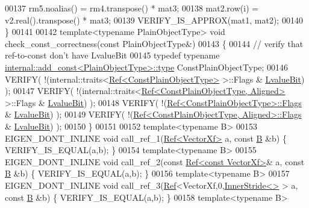 \begin{DoxyCode}
00137   rm5.noalias() = rm4.transpose() * mat3;
00138   mat2.row(i) = v2.real().transpose() * mat3;
00139   VERIFY\_IS\_APPROX(mat1, mat2);
00140 \}
00141 
00142 \textcolor{keyword}{template}<\textcolor{keyword}{typename} PlainObjectType> \textcolor{keywordtype}{void} check\_const\_correctness(\textcolor{keyword}{const} PlainObjectType&)
00143 \{
00144   \textcolor{comment}{// verify that ref-to-const don't have LvalueBit}
00145   \textcolor{keyword}{typedef} \textcolor{keyword}{typename} \hyperlink{group___core___module_class_eigen_1_1_transpose}{internal::add\_const<PlainObjectType>::type} 
      ConstPlainObjectType;
00146   VERIFY( !(internal::traits<\hyperlink{group___core___module_class_eigen_1_1_ref}{Ref<ConstPlainObjectType>} >::Flags & 
      \hyperlink{group__flags_gae2c323957f20dfdc6cb8f44428eaec1a}{LvalueBit}) );
00147   VERIFY( !(internal::traits<\hyperlink{group___core___module_class_eigen_1_1_ref}{Ref<ConstPlainObjectType, Aligned>} >::Flags 
      & \hyperlink{group__flags_gae2c323957f20dfdc6cb8f44428eaec1a}{LvalueBit}) );
00148   VERIFY( !(\hyperlink{group___core___module_class_eigen_1_1_ref}{Ref<ConstPlainObjectType>::Flags} & 
      \hyperlink{group__flags_gae2c323957f20dfdc6cb8f44428eaec1a}{LvalueBit}) );
00149   VERIFY( !(\hyperlink{group___core___module_class_eigen_1_1_ref}{Ref<ConstPlainObjectType, Aligned>::Flags} & 
      \hyperlink{group__flags_gae2c323957f20dfdc6cb8f44428eaec1a}{LvalueBit}) );
00150 \}
00151 
00152 \textcolor{keyword}{template}<\textcolor{keyword}{typename} B>
00153 EIGEN\_DONT\_INLINE \textcolor{keywordtype}{void} call\_ref\_1(\hyperlink{group___core___module_class_eigen_1_1_ref}{Ref<VectorXf>} a, \textcolor{keyword}{const} \hyperlink{group___core___module_class_eigen_1_1_matrix}{B} &b) \{ VERIFY\_IS\_EQUAL(a,b); \}
00154 \textcolor{keyword}{template}<\textcolor{keyword}{typename} B>
00155 EIGEN\_DONT\_INLINE \textcolor{keywordtype}{void} call\_ref\_2(\textcolor{keyword}{const} \hyperlink{group___core___module_class_eigen_1_1_ref}{Ref<const VectorXf>}& a, \textcolor{keyword}{const} 
      \hyperlink{group___core___module_class_eigen_1_1_matrix}{B} &b) \{ VERIFY\_IS\_EQUAL(a,b); \}
00156 \textcolor{keyword}{template}<\textcolor{keyword}{typename} B>
00157 EIGEN\_DONT\_INLINE \textcolor{keywordtype}{void} call\_ref\_3(\hyperlink{group___core___module_class_eigen_1_1_ref}{Ref}<VectorXf,0,\hyperlink{class_eigen_1_1_inner_stride}{InnerStride<>} > a, \textcolor{keyword}{const} 
      \hyperlink{group___core___module_class_eigen_1_1_matrix}{B} &b) \{ VERIFY\_IS\_EQUAL(a,b); \}
00158 \textcolor{keyword}{template}<\textcolor{keyword}{typename} B>

\end{DoxyCode}
